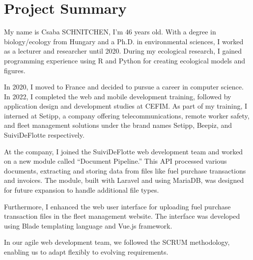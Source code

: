 \chapter{Project Summary}\label{ch:project-summary}


My name is Csaba SCHNITCHEN, I'm 46 years old. With a degree in biology/ecology from Hungary and a Ph.D. in environmental sciences, I worked as a lecturer and researcher until 2020. During my ecological research, I gained programming experience using R and Python for creating ecological models and figures.

In 2020, I moved to France and decided to pursue a career in computer science. In 2022, I completed the web and mobile development training, followed by application design and development studies at CEFIM. As part of my training, I interned at Setipp, a company offering telecommunications, remote worker safety, and fleet management solutions under the brand names Setipp, Beepiz, and SuiviDeFlotte respectively.

At the company, I joined the SuiviDeFlotte web development team and worked on a new module called ``Document Pipeline.'' This API processed various documents, extracting and storing data from files like fuel purchase transactions and invoices. The module, built with Laravel and using MariaDB, was designed for future expansion to handle additional file types.

Furthermore, I enhanced the web user interface for uploading fuel purchase transaction files in the fleet management website. The interface was developed using Blade templating language and Vue.js framework.

In our agile web development team, we followed the SCRUM methodology, enabling us to adapt flexibly to evolving requirements.